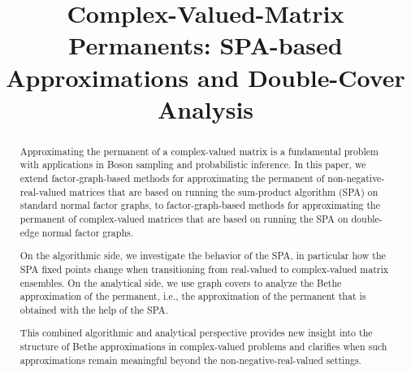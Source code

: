 \documentclass[conference]{IEEEtran}
\theoremstyle{plain}
\theoremstyle{definition}
\begin{document}

\title{Complex-Valued-Matrix Permanents: SPA-based Approximations
 and Double-Cover Analysis
}


\author{
}


\maketitle


\iflongversion
 \thispagestyle{plain}
 \pagestyle{plain}
\fi


\begin{abstract}

 Approximating the permanent of a complex-valued matrix is a fundamental
 problem with applications in Boson sampling and probabilistic inference. In
 this paper, we extend factor-graph-based methods for approximating the
 permanent of non-negative-real-valued matrices that are based on running the
 sum-product algorithm (SPA) on standard normal factor graphs, to
 factor-graph-based methods for approximating the permanent of complex-valued
 matrices that are based on running the SPA on double-edge normal factor
 graphs.

 On the algorithmic side, we investigate the behavior of the SPA, in particular
 how the SPA fixed points change when transitioning from real-valued to
 complex-valued matrix ensembles. On the analytical side, we use graph covers
 to analyze the Bethe approximation of the permanent, i.e., the approximation
 of the permanent that is obtained with the help of the SPA.

 This combined algorithmic and analytical perspective provides new insight into
 the structure of Bethe approximations in complex-valued problems and clarifies
 when such approximations remain meaningful beyond the non-negative-real-valued
 settings.
\end{abstract}
\end{document}
